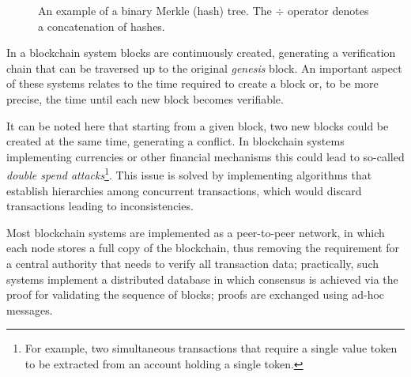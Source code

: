 \begin{figure}[thpb]
  \centering
  \caption{An example of a binary Merkle (hash) tree. The $\div$ operator denotes a concatenation of hashes.}
  \label{fig:merkle}
\end{figure}

In a blockchain system blocks are continuously created, generating a verification chain that can be traversed up to the original \emph{genesis} block. An important aspect of these systems relates to the time required to create a block or, to be more precise, the time until each new block becomes verifiable.

It can be noted here that starting from a given block, two new blocks could be created at the same time, generating a conflict. In blockchain systems implementing currencies or other financial mechanisms this could lead to so-called \emph{double spend attacks}\footnote{For example, two simultaneous transactions that require a single value token to be extracted from an account holding a single token.}. This issue is solved by implementing algorithms that establish hierarchies among concurrent transactions, which would discard transactions leading to inconsistencies.

Most blockchain systems are implemented as a peer-to-peer network, in which each node stores a full copy of the blockchain, thus removing the requirement for a central authority that needs to verify all transaction data; practically, such systems implement a distributed database in which consensus is achieved via the proof for validating the sequence of blocks; proofs are exchanged using ad-hoc messages.

